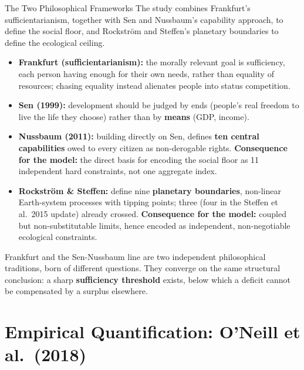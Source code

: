 \documentclass[11pt,aspectratio=169]{beamer}
\begin{document}
\begin{frame}{The Two Philosophical Frameworks}
  \footnotesize
  The study combines Frankfurt's sufficientarianism, together with Sen and Nussbaum's capability approach, to define the social floor, and Rockström and Steffen's planetary boundaries to define the ecological ceiling.
  \begin{itemize}
    \item \textbf{Frankfurt (sufficientarianism):} the morally relevant goal is \alert{sufficiency}, each person having enough for their own needs, rather than equality of resources; chasing equality instead alienates people into status competition.
    \item \textbf{Sen (1999):} development should be judged by \alert{ends} (people's real freedom to live the life they choose) rather than by \textbf{means} (GDP, income).
    \item \textbf{Nussbaum (2011):} building directly on Sen, defines \textbf{ten central capabilities} owed to every citizen as non-derogable rights. \textbf{Consequence for the model:} the direct basis for encoding the social floor as \alert{11 independent hard constraints}, not one aggregate index.
    \item \textbf{Rockström \& Steffen:} define nine \textbf{planetary boundaries}, non-linear Earth-system processes with tipping points; three (four in the Steffen et al.\ 2015 update) already crossed. \textbf{Consequence for the model:} coupled but non-substitutable limits, hence encoded as \alert{independent, non-negotiable ecological constraints}.
  \end{itemize}
  Frankfurt and the Sen-Nussbaum line are two independent philosophical traditions, born of different questions. They converge on the same structural conclusion: a sharp \textbf{sufficiency threshold} exists, below which a deficit cannot be compensated by a surplus elsewhere.
\end{frame}

\section[O'Neill Quantification]{Empirical Quantification: O'Neill et al.\ (2018)}
\end{document}

